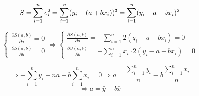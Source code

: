 \documentclass[
]{book}
\begin{document}
\[
S = \sum_{i=1}^{n} e_i^2 = \sum_{i=1}^{n} (y_i - (a + bx_i))^2 = \sum_{i=1}^{n} (y_i - a - bx_i)^2\\
\]

\[
\left\{
  \begin{array}{l}
    \frac{\partial S(a, b)}{\partial a} = 0 \\
    \frac{\partial S(a, b)}{\partial b} = 0
  \end{array}
\right.
\Longrightarrow
\left\{
  \begin{array}{l}
    \frac{\partial S(a, b)}{\partial a} = - \sum_{i=1}^{n} 2(y_i - a - b x_i) = 0 \\
    \frac{\partial S(a, b)}{\partial b} = - \sum_{i=1}^{n} x_i \cdot 2(y_i - a - b x_i) = 0
  \end{array}
\right.
\]

\[
\Longrightarrow 
- \sum_{i=1}^{n} y_i + n a + b \sum_{i=1}^{n} x_i = 0
\Longrightarrow
a = \frac{\sum_{i=1}^{n} y_i}{n} - b \frac{\sum_{i=1}^{n} x_i}{n}
\]
\[
\Longrightarrow
a = \bar{y} - b\bar{x}
\]

  
\end{document}
